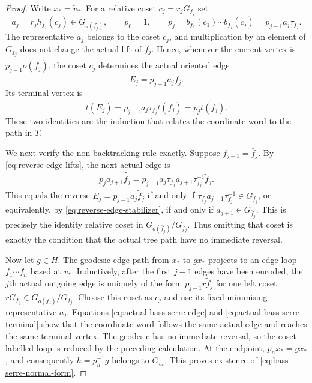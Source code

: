 \documentclass[11pt]{article}
\theoremstyle{definition}
\begin{document}
\begin{proof}
Write $x_*=\widetilde v_*$.  For a relative coset
$c_j=r_jG_{f_j}$ set
\[
 a_j=r_jh_{f_j}(c_j)\in G_{o(f_j)},
 \qquad
 p_0=1,
 \qquad
 p_j=b_{f_1}(c_1)\cdots b_{f_j}(c_j)
      =p_{j-1}a_j\tau_{f_j}.
\]
The representative $a_j$ belongs to the coset $c_j$, and multiplication by an element of
$G_{f_j}$ does not change the actual lift of $f_j$.  Hence, whenever the current vertex is
$p_{j-1}\widetilde{o(f_j)}$, the coset $c_j$ determines the actual oriented edge
\begin{equation}\label{eq:actual-bass-serre-edge}
 E_j=p_{j-1}a_j\widetilde f_j.
\end{equation}
Its terminal vertex is
\begin{equation}\label{eq:actual-bass-serre-terminal}
 t(E_j)=p_{j-1}a_j\tau_{f_j}\widetilde{t(f_j)}
       =p_j\widetilde{t(f_j)}.
\end{equation}
These two identities are the induction that relates the coordinate word to the path in $T$.

We next verify the non-backtracking rule exactly.  Suppose
$f_{j+1}=\bar f_j$.  By \eqref{eq:reverse-edge-lifts}, the next actual edge is
\[
 p_j a_{j+1}\widetilde{\bar f_j}
 =p_{j-1}a_j\tau_{f_j}a_{j+1}\tau_{f_j}^{-1}
   \overline{\widetilde f_j}.
\]
This equals the reverse
$\overline{E_j}=p_{j-1}a_j\overline{\widetilde f_j}$ if and only if
$\tau_{f_j}a_{j+1}\tau_{f_j}^{-1}\in G_{f_j}$, or equivalently, by
\eqref{eq:reverse-edge-stabilizer}, if and only if
$a_{j+1}\in G_{\bar f_j}$.  This is precisely the identity relative coset in
$G_{o(\bar f_j)}/G_{\bar f_j}$.  Thus omitting that coset is exactly the condition that the
actual tree path have no immediate reversal.

Now let $g\in H$.  The geodesic edge path from $x_*$ to $gx_*$ projects to an edge loop
$f_1\cdots f_n$ based at $v_*$.  Inductively, after the first $j-1$ edges have been encoded,
the $j$th actual outgoing edge is uniquely of the form
$p_{j-1}r\widetilde f_j$ for one left coset
$rG_{f_j}\in G_{o(f_j)}/G_{f_j}$.  Choose this coset as $c_j$ and use its fixed minimising
representative $a_j$. Equations \eqref{eq:actual-bass-serre-edge} and
\eqref{eq:actual-bass-serre-terminal} show that the coordinate word follows the same actual
edge and reaches the same terminal vertex.  The geodesic has no immediate reversal, so the
coset-labelled loop is reduced by the preceding calculation.  At the endpoint,
$p_nx_*=gx_*$, and consequently
$h=p_n^{-1}g$ belongs to $G_{v_*}$.  This proves existence of
\eqref{eq:bass-serre-normal-form}.


\end{proof}
\end{document}
